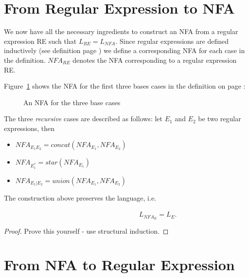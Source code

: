 \section{From Regular Expression to NFA}\label{re2fsasec}

We now have all the necessary ingredients to construct an NFA from a regular
expression RE such that $L_{RE} = L_{NFA}$. Since regular
expressions are defined inductively (see definition page
\pageref{defregexp}) we define a corresponding NFA for each case in the
definition. $NFA_{RE}$ denotes the NFA corresponding to a
regular expression RE.

Figure~\ref{re2fsa} shows the NFA for the first three bases cases in
the definition on page \pageref{defregexp}:

\begin{figure}[h]
\caption{An NFA for the three base cases\label{re2fsa}}
\end{figure}

The three {\em recursive} cases are described as follows: let $E_1$
and $E_2$ be two regular expressions, then
\begin{itemize}
\item $NFA_{E_1E_2} = concat(NFA_{E_1},NFA_{E_2})$
\item $NFA_{E_1^*} = star(NFA_{E_1})$
\item $NFA_{E_1|E_2} = union(NFA_{E_1},NFA_{E_2})$
\end{itemize}

\begin{theorem}
The construction above preserves the language, i.e.

~~~~~~~~~~~~~~~~~~~~~~~~~~~~~~~~~~~~~~~ $L_{NFA_E} = L_E$.
\end{theorem}
\begin{proof}
Prove this yourself - use structural induction.
\end{proof}


\section{From NFA to Regular Expression}

